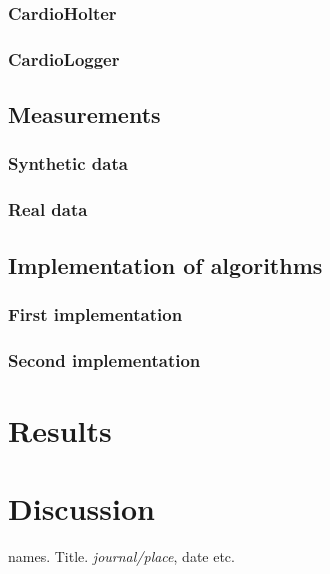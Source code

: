 \documentclass{report}
\begin{document}
\subsection{CardioHolter}
\subsection{CardioLogger}

\section{Measurements}
\subsection{Synthetic data}
\subsection{Real data}

\section{Implementation of algorithms}
\subsection{First implementation}
\subsection{Second implementation}

\chapter{Results}

\chapter{Discussion}




 \renewcommand\bibname{References}
 \begin{thebibliography}{1}

   names. Title. {\em journal/place}, date etc.





  \end{thebibliography}
\end{document}
